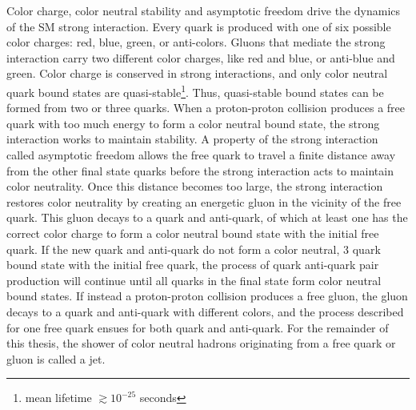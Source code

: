 Color charge, color neutral stability and asymptotic freedom drive the dynamics of the SM strong interaction.  
Every quark is produced with one of six possible color charges: red, blue, green, or anti-colors.  Gluons 
that mediate the strong interaction carry two different color charges, like red and blue, or anti-blue and 
green.  Color charge is conserved in strong interactions, and only color neutral quark bound states are 
quasi-stable\footnote{mean lifetime $\gtrsim 10^{-25}$ seconds}.  Thus, quasi-stable bound states can be formed 
from two or three quarks.  
When a proton-proton collision produces a free quark with too much energy to form a color neutral bound state, 
the strong interaction works to maintain stability.  A property of the strong interaction called 
asymptotic freedom allows the free quark to travel a finite distance away from the other final state quarks 
before the strong interaction acts to maintain color neutrality.  Once this distance becomes too large, the 
strong interaction restores color neutrality by creating an energetic gluon in the vicinity of the free quark.  This 
gluon decays to a quark and anti-quark, of which at least one has the correct color charge to 
form a color neutral bound state with the initial free quark.  If the new quark and anti-quark do not 
form a color neutral, 3 quark bound state with the initial free quark, the process of quark anti-quark 
pair production will continue until all quarks in the final state form color neutral bound states.  If 
instead a proton-proton collision produces a free gluon, the gluon decays to a quark and anti-quark with 
different colors, and the process described for one free quark ensues for both quark and anti-quark.  For 
the remainder of this thesis, the shower of color neutral hadrons originating from a free quark or gluon is 
called a jet.

